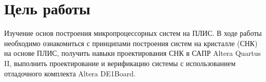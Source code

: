 \setcounter{page}{2}
\chapter*{Цель работы}
Изучение основ построения микропроцессорных систем на ПЛИС. В ходе работы необходимо ознакомиться с принципами построения систем на кристалле (СНК) на основе ПЛИС, получить навыки проектирования СНК в САПР Altera Quartus II, выполнить проектирование и верификацию системы с использованием отладочного комплекта Altera DE1Board.

